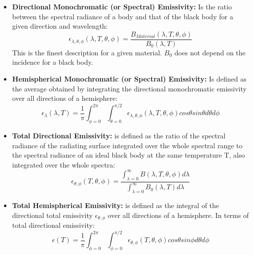 \begin{itemize}
    \item \textbf{Directional Monochromatic (or Spectral) Emissivity: } Is the ratio between the spectral radiance of a body and that of the black body for a given direction and wavelength:
    \begin{equation}
        \epsilon_{\lambda,\theta,\phi}\left(\lambda,T,\theta,\phi\right) = \frac{B_{Material}\left(\lambda,T,\theta,\phi\right)}{B_{0}\left(\lambda,T\right)}
    \end{equation}
    This is the finest description for a given material. $B_0$ does not depend on the incidence for a black body. 
    \item \textbf{Hemispherical Monochromatic (or Spectral) Emissivity: } Is defined as the average obtained by integrating the directional monochromatic emissivity over all directions of a hemisphere:
    \begin{equation}
        \epsilon_{\lambda}\left(\lambda,T \right) = \frac{1}{\pi} \int_{\phi = 0}^{2\pi}\int_{\theta=0}^{\pi/2} \epsilon_{\lambda,\theta,\phi} \left(\lambda,T,\theta,\phi\right) cos\theta sin\theta d\theta d\phi
    \end{equation}
    \item \textbf{Total Directional Emissivity: } is defined as the ratio of the spectral radiance of the radiating surface integrated over the whole spectral range  to the spectral radiance of an ideal black body at the same temperature T, also integrated over the whole spectra:
    \begin{equation}
        \epsilon_{\theta,\phi}\left(T,\theta,\phi\right) = \frac{\int_{\lambda=0}^{\infty}B\left(\lambda,T,\theta,\phi\right)d\lambda}{\int_{\lambda=0}^{\infty}B_0\left(\lambda,T\right)d\lambda}
    \end{equation}

    \item \textbf{Total Hemispherical Emissivity: } is defined as the integral of the directional total emissivity $\epsilon_{\theta,\phi}$ over all directions of a hemisphere. In terms of total directional emissivity: 
    \begin{equation}
        \epsilon\left(T\right) = \frac{1}{\pi}\int^{2\pi}_{\phi=0}\int^{\pi/2}_{\phi=0}\epsilon_{\theta,\phi}\left(T,\theta,\phi\right)cos\theta sin \phi d\theta d\phi
    \end{equation}
\end{itemize}


